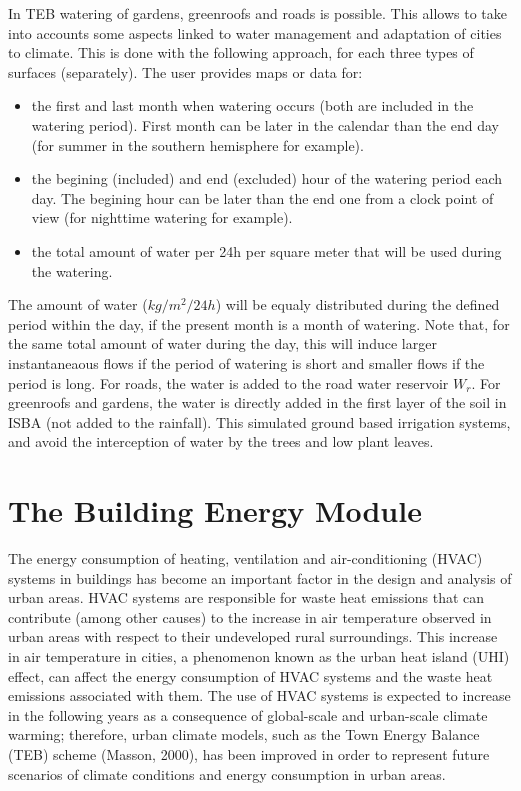 In TEB watering of gardens, greenroofs and roads is possible.  This allows to take into accounts some aspects linked to water management and adaptation of cities to climate. This is done with the following approach, for each three types of surfaces (separately). The user provides maps or data for:
\begin{itemize}
	\item the first and last month when watering occurs (both are included in the watering period). First month can be later in the calendar than the end day (for summer in the southern hemisphere for example).
	\item the begining (included) and end (excluded) hour of the watering period each day. The begining hour can be later than the end one from a clock point of view (for nighttime watering for example).
	\item the total amount of water per 24h per square meter that will be used during the watering.
\end{itemize}

The amount of water ($kg/m^2/24h$) will be equaly distributed during the defined period within the day, if the present month is a month of watering. Note that, for the same total amount of water during the day, this will induce larger instantaneaous flows if the period of watering is short and smaller flows if the period is long. For roads, the water is added to the road water reservoir $W_r$. For greenroofs and gardens, the water is directly added in the first layer of the soil in ISBA (not added to the rainfall). This simulated ground based irrigation systems, and avoid the interception of water by the trees and low plant leaves. \\

\clearpage
\section{The Building Energy Module}

The  energy  consumption  of  heating,  ventilation  and  air-conditioning  (HVAC)  systems  in  buildings  has  become  an important factor in the design and analysis of urban areas.  HVAC systems are responsible for waste heat emissions that can  contribute  (among  other  causes)  to  the  increase  in  air temperature observed in urban areas with respect to their undeveloped rural surroundings. This increase in air temperature in cities, a phenomenon known as the urban heat island (UHI) effect, can affect the energy consumption of HVAC systems and the waste heat emissions associated with them. The use of HVAC systems is expected to increase in the following years as a consequence  of  global-scale  and  urban-scale  climate  warming; therefore, urban climate models, such as the Town Energy Balance (TEB) scheme (Masson, 2000), has been improved in order to represent future scenarios of climate conditions and energy consumption in urban areas.\\

